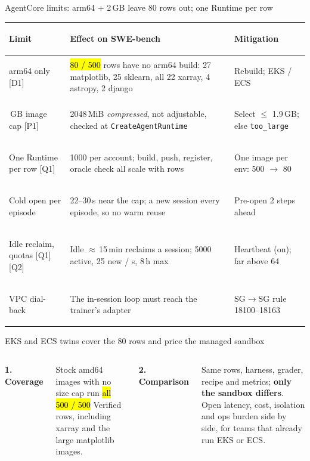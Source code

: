 \begin{frame}{AgentCore limits: arm64 + 2\,GB leave 80 rows out; one Runtime per row}
\scriptsize
\begin{tabularx}{\textwidth}{@{}>{\bfseries\raggedright\arraybackslash}p{2.7cm}XX@{}}
\toprule
Limit & Effect on SWE-bench & Mitigation\\
\midrule
arm64 only [D1] & \hl{80 / 500} rows have no arm64 build: 27 matplotlib, 25 sklearn, all 22 xarray, 4 astropy, 2 django & Rebuild; EKS / ECS\\
2\,GB image cap [P1] & 2048\,MiB \emph{compressed}, not adjustable, checked at \texttt{CreateAgentRuntime} & Select $\le$ 1.9\,GB; else \texttt{too\_large}\\
One Runtime per row [Q1] & 1000 per account; build, push, register, oracle check all scale with rows & One image per env: 500 $\rightarrow$ 80\\
Cold open per episode & 22--30\,s near the cap; a new session every episode, so no warm reuse & Pre-open 2 steps ahead\\
Idle reclaim, quotas [Q1][Q2] & Idle $\approx$\,15\,min reclaims a session; 5000 active, 25 new / s, 8\,h max & Heartbeat (on); far above 64\\
VPC dial-back & The in-session loop must reach the trainer's adapter & SG$\rightarrow$SG rule 18100--18163\\
\bottomrule
\end{tabularx}
\end{frame}

\begin{frame}{EKS and ECS twins cover the 80 rows and price the managed sandbox}
\begin{columns}[T]
{\small\bfseries\color{awsteal}1. Coverage\par}\vspace{1mm}
\footnotesize
Stock amd64 images with no size cap run \hl{all 500 / 500} Verified rows, including xarray and the large matplotlib images.
{\small\bfseries\color{awsteal}2. Comparison\par}\vspace{1mm}
\footnotesize
Same rows, harness, grader, recipe and metrics; \textbf{only the sandbox differs}. Open latency, cost, isolation and ops burden side by side, for teams that already run EKS or ECS.
\end{columns}
\par\vspace{6mm}
\end{frame}

